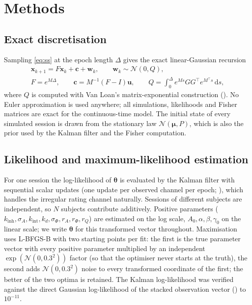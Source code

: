 \documentclass[12pt,a4paper]{article}
\theoremstyle{plain}
\theoremstyle{definition}
\theoremstyle{remark}
\newcommand{\kinh}{k_{\mathrm{inh}}}
\newcommand{\kint}{k_{\mathrm{int}}}
\newcommand{\kd}{k_{d}}
\newcommand{\sA}{\sigma_{A}}
\newcommand{\sPhi}{\sigma_{\Phi}}
\newcommand{\rA}{r_{A}}
\newcommand{\rPhi}{r_{\Phi}}
\newcommand{\rQ}{r_{Q}}
\renewcommand{\dd}{\,\mathrm{d}}   %
\newcommand{\thetav}{\boldsymbol{\theta}}
\newcommand{\muv}{\boldsymbol{\mu}}
\newcommand{\xv}{\mathbf{x}}
\newcommand{\uv}{\mathbf{u}}
\begin{document}
\section{Methods}
\label{sec:methods}

\subsection{Exact discretisation}
\label{sec:disc}

Sampling \eqref{eq:ss} at the epoch length $\Delta$ gives the exact linear-Gaussian recursion
\begin{equation}
\begin{gathered}
  \xv_{k+1}=F\xv_k+\mathbf c+\mathbf w_k,\qquad \mathbf w_k\sim\mathcal N(0,Q),\\
  F=e^{M\Delta},\qquad \mathbf c=M^{-1}(F-I)\uv,\qquad Q=\int_0^\Delta e^{Ms}GG^\top e^{M^\top s}\dd s,
\end{gathered}
  \label{eq:disc}
\end{equation}
where $Q$ is computed with Van Loan's matrix-exponential construction \citep{VanLoan1978} (). No Euler approximation is used anywhere; all simulations, likelihoods and Fisher matrices are exact for the continuous-time model. The initial state of every simulated session is drawn from the stationary law $\mathcal N(\muv,P)$, which is also the prior used by the Kalman filter and the Fisher computation.

\subsection{Likelihood and maximum-likelihood estimation}
\label{sec:mle}

For one session the log-likelihood of $\thetav$ is evaluated by the Kalman filter \citep{Kalman1960,Harvey1989,Durbin2012} with sequential scalar updates (one update per observed channel per epoch; ), which handles the irregular rating channel naturally. Sessions of different subjects are independent, so $N$ subjects contribute additively. Positive parameters ($\kinh,\sA,\kint,\kd,\sPhi,\rA,\rPhi,\rQ$) are estimated on the log scale, $A_0,\alpha,\beta,\gamma_0$ on the linear scale; we write $\thetav$ for this transformed vector throughout. Maximisation uses L-BFGS-B \citep{Byrd1995} with two starting points per fit: the first is the true parameter vector with every positive parameter multiplied by an independent $\exp(\mathcal N(0,0.3^2))$ factor (so that the optimiser never starts at the truth), the second adds $\mathcal N(0,0.3^2)$ noise to every transformed coordinate of the first; the better of the two optima is retained. The Kalman log-likelihood was verified against the direct Gaussian log-likelihood of the stacked observation vector () to $10^{-11}$.
\end{document}
